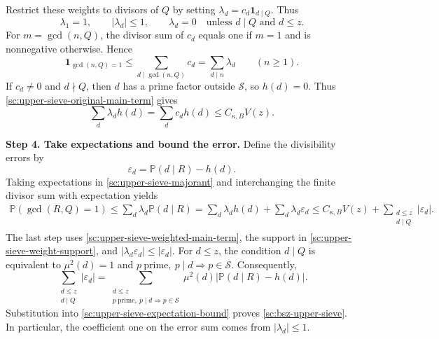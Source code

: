 \documentclass[twoside]{aomart}
\makeatletter
\theoremstyle{paperplain}
\theoremstyle{paperdefinition}
\renewenvironment{proof}[1][\proofname]{\par\pushQED{\qed}%
  \normalfont\topsep6\p@\@plus3\p@\relax\trivlist
  \item[\hskip\labelsep\itshape #1\@addpunct{.}]\ignorespaces
}{\popQED\endtrivlist\@endpefalse}
\numberwithin{equation}{section}
\makeatother
\begin{document}
\begin{proof}[Proof of \eqref{sc:bsz-upper-sieve}]
Restrict these weights to divisors of $Q$ by setting
$\lambda_d=c_d\mathbf1_{d\mid Q}$. Thus
\begin{equation}
 \lambda_1=1,\qquad |\lambda_d|\le1,\qquad
 \lambda_d=0\quad\text{unless }d\mid Q\text{ and }d\le z.
 \label{sc:upper-sieve-weight-support}
\end{equation}
For $m=\gcd(n,Q)$, the divisor sum of $c_d$ equals one if $m=1$
and is nonnegative otherwise. Hence
\begin{equation}
 \mathbf1_{\gcd(n,Q)=1}
 \le\sum_{d\mid\gcd(n,Q)}c_d
 =\sum_{d\mid n}\lambda_d
 \qquad(n\ge1).
 \label{sc:upper-sieve-majorant}
\end{equation}
If $c_d\ne0$ and $d\nmid Q$, then $d$ has a prime factor outside
$\mathcal S$, so $h(d)=0$.
Thus \eqref{sc:upper-sieve-original-main-term} gives
\begin{equation}
 \sum_d\lambda_d h(d)=\sum_dc_dh(d)\le C_{\kappa,B}V(z).
 \label{sc:upper-sieve-weighted-main-term}
\end{equation}

\medskip
\noindent\textbf{Step 4. Take expectations and bound the error.}
Define the divisibility errors by
\begin{equation*}
 \varepsilon_d=\mathbb P(d\mid R)-h(d).
\end{equation*}
Taking expectations in \eqref{sc:upper-sieve-majorant} and
interchanging the finite divisor sum with expectation yields
\begin{equation}
 \begin{aligned}
 \mathbb P(\gcd(R,Q)=1)
 \le\sum_d\lambda_d\mathbb P(d\mid R)
 =\sum_d\lambda_dh(d)+\sum_d\lambda_d\varepsilon_d
 \le C_{\kappa,B}V(z)
       +\sum_{\substack{d\le z\\d\mid Q}}|\varepsilon_d|.
 \end{aligned}
 \label{sc:upper-sieve-expectation-bound}
\end{equation}
The last step uses \eqref{sc:upper-sieve-weighted-main-term},
the support in \eqref{sc:upper-sieve-weight-support}, and
$|\lambda_d\varepsilon_d|\le|\varepsilon_d|$.
For $d\le z$, the condition $d\mid Q$ is equivalent to
$\mu^2(d)=1$ and $p\ \mathrm{prime},\ p\mid d\Rightarrow p\in\mathcal S$.
Consequently,
\begin{equation*}
 \sum_{\substack{d\le z\\d\mid Q}}|\varepsilon_d|
 =\sum_{\substack{d\le z\\p\ \mathrm{prime},\ p\mid d\Rightarrow p\in\mathcal S}}
       \mu^2(d)\left|\mathbb P(d\mid R)-h(d)\right|.
\end{equation*}
Substitution into \eqref{sc:upper-sieve-expectation-bound} proves
\eqref{sc:bsz-upper-sieve}. In particular, the coefficient one on
the error sum comes from $|\lambda_d|\le1$.
\end{proof}
\end{document}
